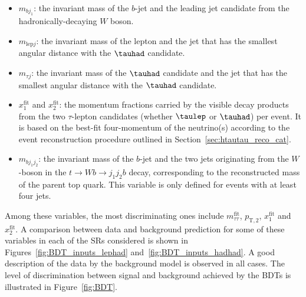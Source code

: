 \begin{itemize}
\item $m_{b j_1}$: the invariant mass of the $b$-jet and the leading jet candidate from the hadronically-decaying $W$ boson.
\item $m_{\text{lep}j}$: the invariant mass of the lepton and the jet that has the smallest angular distance with the $\tauhad$ candidate.
\item $m_{\tau j}$: the invariant mass of the  $\tauhad$ candidate and the jet that has the smallest angular distance with the $\tauhad$ candidate.
\item $x_{1}^{\text{fit}}$ and $x_{2}^{\text{fit}}$: the momentum fractions carried by the visible decay products from the two $\tau$-lepton candidates 
(whether $\taulep$ or $\tauhad$) per event. It is based on the best-fit four-momentum of the neutrino(s) according to the event reconstruction procedure outlined in Section~\ref{sec:htautau_reco_cat}.
\item $m_{bj_1j_2}$: the invariant mass of the $b$-jet and the two jets originating from the $W$-boson in the $t\to Wb \to j_1j_2b$ decay, corresponding to the reconstructed mass of the parent top quark. This variable is only defined for events with at least four jets.
\end{itemize}

Among these variables, the most discriminating ones include $m_{\tau\tau}^{\text{fit}}$, $p_{\text{T},2}$, $x_{1}^{\text{fit}}$ and $x_{2}^{\text{fit}}$. A comparison between data and background prediction 
for some of these variables in each of the SRs considered is shown in Figures~\ref{fig:BDT_inputs_lephad} and~\ref{fig:BDT_inputs_hadhad}.
A good description of the data by the background model is observed in all cases.
The level of discrimination between signal and background achieved by the BDTs is illustrated in Figure~\ref{fig:BDT}.

